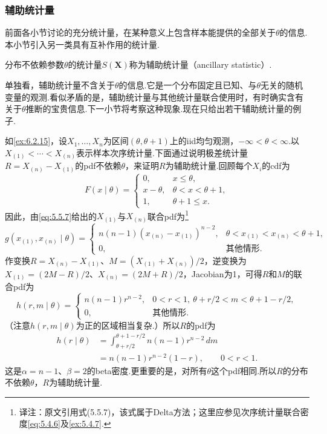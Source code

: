 \subsubsection{辅助统计量}\label{sec:6.2.3}
前面各小节讨论的充分统计量，在某种意义上包含样本能提供的全部关于$\theta$的信息.本小节引入另一类具有互补作用的统计量.
\begin{definition}\label{def:6.2.16}
分布不依赖参数$\theta$的统计量$S(\boldsymbol X)$称为辅助统计量（ancillary statistic）.
\end{definition}
单独看，辅助统计量不含关于$\theta$的信息.它是一个分布固定且已知、与$\theta$无关的随机变量的观测.看似矛盾的是，辅助统计量与其他统计量联合使用时，有时确实含有关于$\theta$推断的宝贵信息.下一小节将考察这种现象.现在只给出若干辅助统计量的例子.
\begin{example}[均匀分布的辅助统计量]\label{ex:6.2.17}
如\autoref{ex:6.2.15}，设$X_1,\ldots,X_n$为区间$(\theta,\theta+1)$上的iid均匀观测，$-\infty<\theta<\infty$.以$X_{(1)}<\cdots<X_{(n)}$表示样本次序统计量.下面通过说明极差统计量$R=X_{(n)}-X_{(1)}$的pdf不依赖$\theta$，来证明$R$为辅助统计量.回顾每个$X_i$的cdf为
$$F(x\mid\theta)=\begin{cases}0,&x\le\theta,\\x-\theta,&\theta<x<\theta+1,\\1,&\theta+1\le x.\end{cases}$$
因此，由\eqref{eq:5.5.7}给出的$X_{(1)}$与$X_{(n)}$联合pdf为\footnote{译注：原文引用式(5.5.7)，该式属于Delta方法；这里应参见次序统计量联合密度\eqref{eq:5.4.6}及\autoref{ex:5.4.7}.}
$$g(x_{(1)},x_{(n)}\mid\theta)=\begin{cases}n(n-1)(x_{(n)}-x_{(1)})^{n-2},&\theta<x_{(1)}<x_{(n)}<\theta+1,\\0,&\text{其他情形}.\end{cases}$$
作变换$R=X_{(n)}-X_{(1)}$、$M=(X_{(1)}+X_{(n)})/2$，逆变换为$X_{(1)}=(2M-R)/2$、$X_{(n)}=(2M+R)/2$，Jacobian为1，可得$R$和$M$的联合pdf为
$$h(r,m\mid\theta)=\begin{cases}n(n-1)r^{n-2},&0<r<1,\ \theta+r/2<m<\theta+1-r/2,\\0,&\text{其他情形}.\end{cases}$$
（注意$h(r,m\mid\theta)$为正的区域相当复杂.）所以$R$的pdf为
\begin{align*}
h(r\mid\theta)&=\int_{\theta+r/2}^{\theta+1-r/2}n(n-1)r^{n-2}\,dm\\
&=n(n-1)r^{n-2}(1-r),\qquad0<r<1.
\end{align*}
这是$\alpha=n-1$、$\beta=2$的beta密度.更重要的是，对所有$\theta$这个pdf相同.所以$R$的分布不依赖$\theta$，$R$为辅助统计量.
\end{example}
